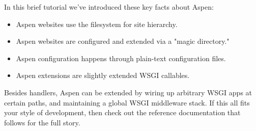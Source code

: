 In this brief tutorial we've introduced these key facts about Aspen:

\begin{itemize}
\item{Aspen websites use the filesystem for site hierarchy.}
\item{Aspen websites are configured and extended via a "magic directory."}
\item{Aspen configuration happens through plain-text configuration files.}
\item{Aspen extensions are slightly extended WSGI callables.}
\end{itemize}

Besides handlers, Aspen can be extended by wiring up arbitrary WSGI apps at
certain paths, and maintaining a global WSGI middleware stack. If this all fits
your style of development, then check out the reference documentation that
follows for the full story.
